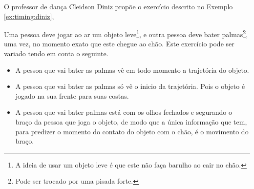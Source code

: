 O professor de dança Cleidson Diniz propõe \cite{TimingTreino1} 
o exercício descrito no Exemplo \ref{ex:timing:diniz},
\begin{example}
\label{ex:timing:diniz}
Uma pessoa deve jogar ao ar um objeto leve\footnote{A ideia de usar um objeto leve 
é que este não faça barulho ao cair no chão.}, 
e outra pessoa deve bater palmas\footnote{Pode ser trocado por uma pisada forte.}, 
uma vez, no momento exato que este chegue ao chão.
Este exercício pode ser variado tendo em conta o seguinte.
\begin{itemize}
\item A pessoa que vai bater as palmas vê em todo momento a trajetória do objeto.
\item A pessoa que vai bater as palmas só vê o inicio da trajetória. 
Pois o objeto é jogado na sua frente para suas costas.
\item A pessoa que vai bater palmas está com os olhos fechados
e segurando o braço da pessoa que joga o objeto,
de modo que a única informação que tem, 
para predizer o momento do contato do objeto com o chão, 
é o movimento do braço. 
\end{itemize}
\end{example}



